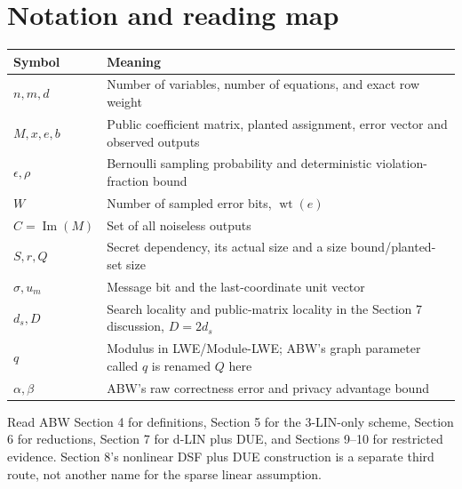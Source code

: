 \documentclass[11pt,a4paper]{article}
\newcommand{\wt}{\operatorname{wt}}
\newcommand{\Image}{\operatorname{Im}}
\begin{document}
\section{Notation and reading map}
\begin{center}
\begin{tabularx}{\textwidth}{@{}p{2.3cm}X@{}}\toprule
Symbol & Meaning\\\midrule
$n,m,d$ & Number of variables, number of equations, and exact row weight\\
$M,x,e,b$ & Public coefficient matrix, planted assignment, error vector and observed outputs\\
$\epsilon,\rho$ & Bernoulli sampling probability and deterministic violation-fraction bound\\
$W$ & Number of sampled error bits, $\wt(e)$\\
$C=\Image(M)$ & Set of all noiseless outputs\\
$S,r,Q$ & Secret dependency, its actual size and a size bound/planted-set size\\
$\sigma,u_m$ & Message bit and the last-coordinate unit vector\\
$d_s,D$ & Search locality and public-matrix locality in the Section 7 discussion, $D=2d_s$\\
$q$ & Modulus in LWE/Module-LWE; ABW's graph parameter called $q$ is renamed $Q$ here\\
$\alpha,\beta$ & ABW's raw correctness error and privacy advantage bound\\\bottomrule
\end{tabularx}
\end{center}

Read ABW Section 4 for definitions, Section 5 for the 3-LIN-only scheme, Section 6 for reductions, Section 7 for d-LIN plus DUE, and Sections 9--10 for restricted evidence. Section 8's nonlinear DSF plus DUE construction is a separate third route, not another name for the sparse linear assumption.
\end{document}
